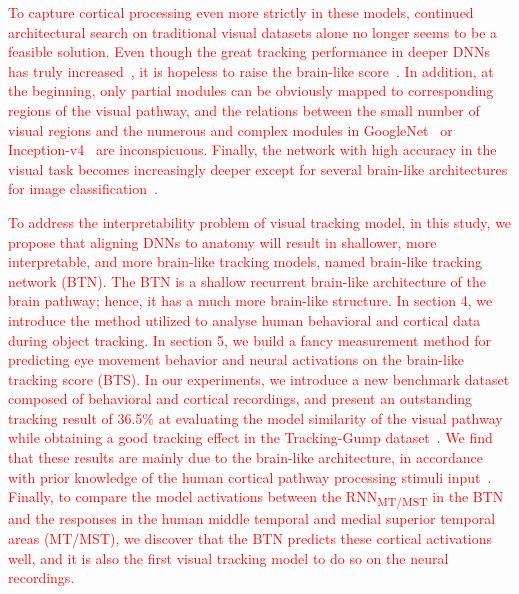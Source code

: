 \documentclass[final,3p,times,twocolumn]{elsarticle}
\begin{document}
\textcolor{red}{
To capture cortical processing even more strictly in these models, continued architectural search on traditional visual datasets alone no longer seems to be a feasible solution. 
Even though the great tracking performance in deeper DNNs has truly increased~\cite{ILSVRC15,luo2021trajectory}, it is hopeless to raise the brain-like score~\cite{rajalingham2018large,su2020incremental}. 
In addition, at the beginning, only partial modules can be obviously mapped to corresponding regions of the visual pathway, 
and the relations between the small number of visual regions and the numerous and complex modules in GoogleNet~\cite{szegedy2015going} or Inception-v4~\cite{szegedy2017inception} are inconspicuous. 
Finally, the network with high accuracy in the visual task becomes increasingly deeper except for several brain-like architectures for image classification~\cite{TangSchrimpfLotter2018Recurrent, kar2019evidence}. 
}

\textcolor{red}{
To address the interpretability problem of visual tracking model, in this study, we propose that aligning DNNs to anatomy will result in shallower, more interpretable, and more brain-like tracking models, named brain-like tracking network (BTN).
The BTN is a shallow recurrent brain-like architecture of the brain pathway; 
hence, it has a much more brain-like structure. 
In section 4, we introduce the method utilized to analyse human behavioral and cortical data during object tracking. 
In section 5, we build a fancy measurement method for predicting eye movement behavior and neural activations on the brain-like tracking score (BTS). 
In our experiments, we introduce a new benchmark dataset composed of behavioral and cortical recordings, 
and present an outstanding tracking result of 36.5\% at evaluating the model similarity of the visual pathway while obtaining a good tracking effect in the Tracking-Gump dataset~\cite{gaze_forrest}. 
We find that these results are mainly due to the brain-like architecture, in accordance with prior knowledge of the human cortical pathway processing stimuli input~\cite{TangSchrimpfLotter2018Recurrent, yin2020deep, kar2019evidence}. 
Finally, to compare the model activations between the RNN\textsubscript{MT/MST} in the BTN and the responses in the human middle temporal and medial superior temporal areas (MT/MST), we discover that the BTN predicts these cortical activations well, 
and it is also the first visual tracking model to do so on the neural recordings. 
} 
\end{document}
